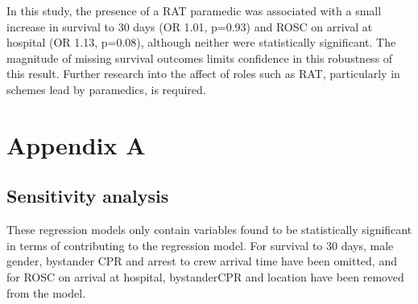 \documentclass[]{article}
\theoremstyle{definition}
\theoremstyle{definition}
\theoremstyle{definition}
\theoremstyle{remark}
\begin{document}
In this study, the presence of a RAT paramedic was associated with a
small increase in survival to 30 days (OR 1.01, p=0.93) and ROSC on
arrival at hospital (OR 1.13, p=0.08), although neither were
statistically significant. The magnitude of missing survival outcomes
limits confidence in this robustness of this result. Further research
into the affect of roles such as RAT, particularly in schemes lead by
paramedics, is required.

\hypertarget{appendix-a}{%
\section{Appendix A}\label{appendix-a}}

\hypertarget{sensitivity-analysis}{%
\subsection{Sensitivity analysis}\label{sensitivity-analysis}}

These regression models only contain variables found to be statistically
significant in terms of contributing to the regression model. For
survival to 30 days, male gender, bystander CPR and arrest to crew
arrival time have been omitted, and for ROSC on arrival at hospital,
bystanderCPR and location have been removed from the model.
\end{document}
